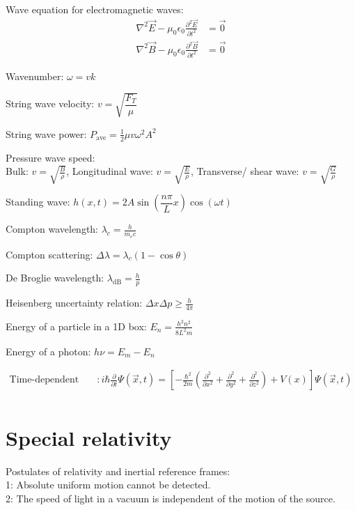\documentclass[12pt,a4paper]{article}
\begin{document}
	Wave equation for electromagnetic waves:\\
	\begin{align*}
		\nabla^2 \vec{E} - \mu_0 \epsilon_0 \frac{\partial^2 \vec{E}}{\partial t^2} &= \vec{0} \\
		\nabla^2 \vec{B} - \mu_0 \epsilon_0 \frac{\partial^2 \vec{B}}{\partial t^2} &= \vec{0}
	\end{align*}
	
	Wavenumber: \( \omega = vk \)
	
	String wave velocity: \( v = \sqrt{\dfrac{F_T}{\mu}}\)
	
	String wave power: \( P_\text{ave} = \frac{1}{2} \mu v \omega ^2 A^2\)
	
	Pressure wave speed:\\
	
	Bulk: \( v = \sqrt{\frac{B}{\rho}}\), Longitudinal wave: \( v = \sqrt{\frac{E}{\rho}}\),  Transverse/ shear wave: \( v = \sqrt{\frac{G}{\rho}}\)
	
	Standing wave: \( h(x, t) = 2A \sin (\dfrac{n\pi}{L}x) \cos (\omega t)\)
	
	Compton wavelength: \( \lambda_c = \frac{h}{m_e c} \)
	
	Compton scattering: \( \Delta \lambda = \lambda_c (1-\cos \theta )\)
	
	De Broglie wavelength: \( \lambda_{\text{dB}} = \frac{h}{p} \)
	
	Heisenberg uncertainty relation: \( \Delta x \Delta p \geq \frac{h}{4\pi} \)
	
	Energy of a particle in a 1D box: \( E_n = \frac{h^2 n^2}{8L^2m} \)
	
	Energy of a photon: \( h \nu = E_m - E_n\)

	\begin{align*}
		\text{Time-dependent Schrodinger's Equation} & : i\hbar \frac{\partial}{\partial t} \Psi (\vec{x}, t) = [-\frac{\hbar^2}{2m}(\frac{\partial ^2}{\partial x^2} + \frac{\partial ^2}{\partial y ^2} + \frac{\partial^2}{\partial z^2}) + V(x)]\Psi (\vec{x}, t) \\
	\end{align*}
	
	\section*{Special relativity}
	Postulates of relativity and inertial reference frames:\\
	1: Absolute uniform motion cannot be detected.\\
	2: The speed of light in a vacuum is independent of the motion of the source.\\
	
\end{document}
